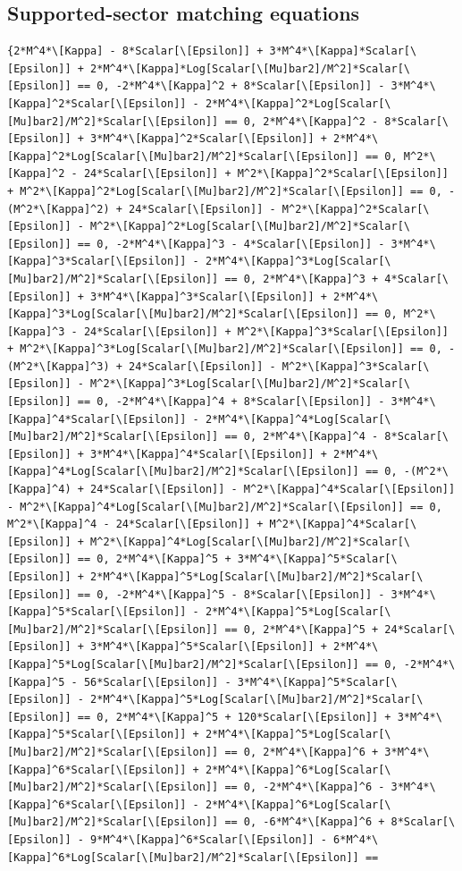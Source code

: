 \documentclass[11pt]{article}
\begin{document}
\subsection{Supported-sector matching equations}
\begin{verbatim}
{2*M^4*\[Kappa] - 8*Scalar[\[Epsilon]] + 3*M^4*\[Kappa]*Scalar[\[Epsilon]] + 2*M^4*\[Kappa]*Log[Scalar[\[Mu]bar2]/M^2]*Scalar[\[Epsilon]] == 0, -2*M^4*\[Kappa]^2 + 8*Scalar[\[Epsilon]] - 3*M^4*\[Kappa]^2*Scalar[\[Epsilon]] - 2*M^4*\[Kappa]^2*Log[Scalar[\[Mu]bar2]/M^2]*Scalar[\[Epsilon]] == 0, 2*M^4*\[Kappa]^2 - 8*Scalar[\[Epsilon]] + 3*M^4*\[Kappa]^2*Scalar[\[Epsilon]] + 2*M^4*\[Kappa]^2*Log[Scalar[\[Mu]bar2]/M^2]*Scalar[\[Epsilon]] == 0, M^2*\[Kappa]^2 - 24*Scalar[\[Epsilon]] + M^2*\[Kappa]^2*Scalar[\[Epsilon]] + M^2*\[Kappa]^2*Log[Scalar[\[Mu]bar2]/M^2]*Scalar[\[Epsilon]] == 0, -(M^2*\[Kappa]^2) + 24*Scalar[\[Epsilon]] - M^2*\[Kappa]^2*Scalar[\[Epsilon]] - M^2*\[Kappa]^2*Log[Scalar[\[Mu]bar2]/M^2]*Scalar[\[Epsilon]] == 0, -2*M^4*\[Kappa]^3 - 4*Scalar[\[Epsilon]] - 3*M^4*\[Kappa]^3*Scalar[\[Epsilon]] - 2*M^4*\[Kappa]^3*Log[Scalar[\[Mu]bar2]/M^2]*Scalar[\[Epsilon]] == 0, 2*M^4*\[Kappa]^3 + 4*Scalar[\[Epsilon]] + 3*M^4*\[Kappa]^3*Scalar[\[Epsilon]] + 2*M^4*\[Kappa]^3*Log[Scalar[\[Mu]bar2]/M^2]*Scalar[\[Epsilon]] == 0, M^2*\[Kappa]^3 - 24*Scalar[\[Epsilon]] + M^2*\[Kappa]^3*Scalar[\[Epsilon]] + M^2*\[Kappa]^3*Log[Scalar[\[Mu]bar2]/M^2]*Scalar[\[Epsilon]] == 0, -(M^2*\[Kappa]^3) + 24*Scalar[\[Epsilon]] - M^2*\[Kappa]^3*Scalar[\[Epsilon]] - M^2*\[Kappa]^3*Log[Scalar[\[Mu]bar2]/M^2]*Scalar[\[Epsilon]] == 0, -2*M^4*\[Kappa]^4 + 8*Scalar[\[Epsilon]] - 3*M^4*\[Kappa]^4*Scalar[\[Epsilon]] - 2*M^4*\[Kappa]^4*Log[Scalar[\[Mu]bar2]/M^2]*Scalar[\[Epsilon]] == 0, 2*M^4*\[Kappa]^4 - 8*Scalar[\[Epsilon]] + 3*M^4*\[Kappa]^4*Scalar[\[Epsilon]] + 2*M^4*\[Kappa]^4*Log[Scalar[\[Mu]bar2]/M^2]*Scalar[\[Epsilon]] == 0, -(M^2*\[Kappa]^4) + 24*Scalar[\[Epsilon]] - M^2*\[Kappa]^4*Scalar[\[Epsilon]] - M^2*\[Kappa]^4*Log[Scalar[\[Mu]bar2]/M^2]*Scalar[\[Epsilon]] == 0, M^2*\[Kappa]^4 - 24*Scalar[\[Epsilon]] + M^2*\[Kappa]^4*Scalar[\[Epsilon]] + M^2*\[Kappa]^4*Log[Scalar[\[Mu]bar2]/M^2]*Scalar[\[Epsilon]] == 0, 2*M^4*\[Kappa]^5 + 3*M^4*\[Kappa]^5*Scalar[\[Epsilon]] + 2*M^4*\[Kappa]^5*Log[Scalar[\[Mu]bar2]/M^2]*Scalar[\[Epsilon]] == 0, -2*M^4*\[Kappa]^5 - 8*Scalar[\[Epsilon]] - 3*M^4*\[Kappa]^5*Scalar[\[Epsilon]] - 2*M^4*\[Kappa]^5*Log[Scalar[\[Mu]bar2]/M^2]*Scalar[\[Epsilon]] == 0, 2*M^4*\[Kappa]^5 + 24*Scalar[\[Epsilon]] + 3*M^4*\[Kappa]^5*Scalar[\[Epsilon]] + 2*M^4*\[Kappa]^5*Log[Scalar[\[Mu]bar2]/M^2]*Scalar[\[Epsilon]] == 0, -2*M^4*\[Kappa]^5 - 56*Scalar[\[Epsilon]] - 3*M^4*\[Kappa]^5*Scalar[\[Epsilon]] - 2*M^4*\[Kappa]^5*Log[Scalar[\[Mu]bar2]/M^2]*Scalar[\[Epsilon]] == 0, 2*M^4*\[Kappa]^5 + 120*Scalar[\[Epsilon]] + 3*M^4*\[Kappa]^5*Scalar[\[Epsilon]] + 2*M^4*\[Kappa]^5*Log[Scalar[\[Mu]bar2]/M^2]*Scalar[\[Epsilon]] == 0, 2*M^4*\[Kappa]^6 + 3*M^4*\[Kappa]^6*Scalar[\[Epsilon]] + 2*M^4*\[Kappa]^6*Log[Scalar[\[Mu]bar2]/M^2]*Scalar[\[Epsilon]] == 0, -2*M^4*\[Kappa]^6 - 3*M^4*\[Kappa]^6*Scalar[\[Epsilon]] - 2*M^4*\[Kappa]^6*Log[Scalar[\[Mu]bar2]/M^2]*Scalar[\[Epsilon]] == 0, -6*M^4*\[Kappa]^6 + 8*Scalar[\[Epsilon]] - 9*M^4*\[Kappa]^6*Scalar[\[Epsilon]] - 6*M^4*\[Kappa]^6*Log[Scalar[\[Mu]bar2]/M^2]*Scalar[\[Epsilon]] == 
\end{verbatim}
\end{document}
